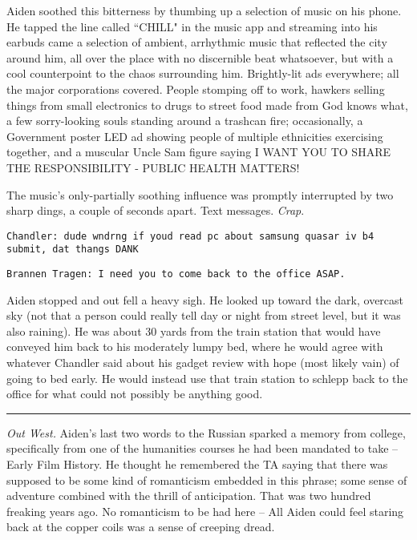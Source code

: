 \documentclass[11pt]{book}
\begin{document}
	Aiden soothed this bitterness by thumbing up a selection of music on his phone. He tapped the line called ``CHILL" in the music app and streaming into his earbuds came a selection of ambient, arrhythmic music that reflected the city around him, all over the place with no discernible beat whatsoever, but with a cool counterpoint to the chaos surrounding him. Brightly-lit ads everywhere; all the major corporations covered. People stomping off to work, hawkers selling things from small electronics to drugs to street food made from God knows what, a few sorry-looking souls standing around a trashcan fire; occasionally, a Government poster LED ad showing people of multiple ethnicities exercising together, and a muscular Uncle Sam figure saying I WANT YOU TO SHARE THE RESPONSIBILITY - PUBLIC HEALTH MATTERS! 
	
	The music's only-partially soothing influence was promptly interrupted by two sharp dings, a couple of seconds apart. Text messages. \textit{Crap}.
	
	\vspace{0.5cm}
	
	\texttt{Chandler: dude wndrng if youd read pc about samsung quasar iv b4 submit, dat thangs DANK} 
	
	\texttt{Brannen Tragen: I need you to come back to the office ASAP.}
	
	\vspace{0.5cm}
	
	Aiden stopped and out fell a heavy sigh. He looked up toward the dark, overcast sky (not that a person could really tell day or night from street level, but it was also raining). He was about 30 yards from the train station that would have conveyed him back to his moderately lumpy bed, where he would agree with whatever Chandler said about his gadget review with hope (most likely vain) of going to bed early. He would instead use that train station to schlepp back to the office for what could not possibly be anything good.
	
	\vspace{0.5cm}
	\hrule
	\vspace{0.5cm}
	
	\textit{Out West.} Aiden's last two words to the Russian sparked a memory from college, specifically from one of the humanities courses he had been mandated to take -- Early Film History. He thought he remembered the TA saying that there was supposed to be some kind of romanticism embedded in this phrase; some sense of adventure combined with the thrill of anticipation. That was two hundred freaking years ago. No romanticism to be had here -- All Aiden could feel staring back at the copper coils was a sense of creeping dread.
	
\end{document}
